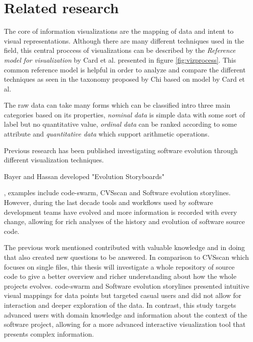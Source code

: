 

\section{Related research}
The core of information visualizations are the mapping of data and intent to visual representations. Although there are many different techniques used in the field, this central proccess of visualizations can be described by the \textit{Reference model for visualization} by Card et al. presented in figure \ref{fig:vizprocess}. \cite{card_readings_1999} 
This common reference model is helpful in order to analyze and compare the different techniques as seen in the taxonomy proposed by Chi based on model by Card et al. \cite{chi_taxonomy_2000}



The raw data can take many forms which can be classified intro three main categories based on its properties, \textit{nominal data} is simple data with some sort of label but no quantitative value, \textit{ordinal data} can be ranked according to some attribute and \textit{quantitative data} which support arithmetic operations. \cite{card_structure_1997}

Previous research has been published investigating software evolution through different visualization techniques. 


Bayer and Hassan developed "Evolution Storyboards"


, examples include code-swarm, CVSscan and Software evolution storylines. However, during the last decade tools and workflows used by software development teams have evolved and more information is recorded with every change, allowing for rich analyses of the history and evolution of software source code.

The previous work mentioned contributed with valuable knowledge and in doing that also created new questions to be answered.
In comparison to CVSscan which focuses on single files, this thesis will investigate a whole repository of source code to give a better overview and richer understanding about how the whole projects evolves.
code-swarm and Software evolution storylines presented intuitive visual mappings for data points but targeted casual users and did not allow for interaction and deeper exploration of the data.
In contrast, this study targets advanced users with domain knowledge and information about the context of the software project, allowing for a more advanced interactive visualization tool that presents complex information.
